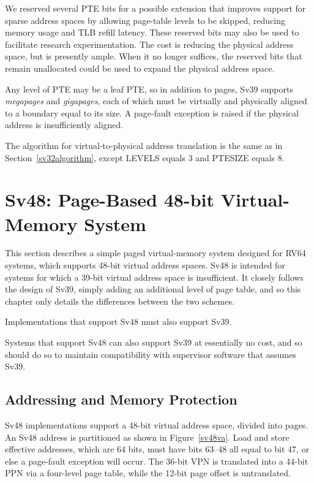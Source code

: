 \begin{commentary}
We reserved several PTE bits for a possible extension that improves
support for sparse address spaces by allowing page-table levels to be
skipped, reducing memory usage and TLB refill latency.  These reserved
bits may also be used to facilitate research experimentation.  The
cost is reducing the physical address space, but  is
presently ample.  When it no longer suffices, the reserved
bits that remain unallocated could be used to expand the physical
address space.
\end{commentary}

Any level of PTE may be a leaf PTE, so in addition to 
pages, Sv39 supports  {\em megapages} and
 {\em gigapages}, each of which must be virtually and
physically aligned to a boundary equal to its size.
A page-fault exception is raised if the physical address is insufficiently
aligned.

The algorithm for virtual-to-physical address translation is the same as in
Section~\ref{sv32algorithm}, except LEVELS equals 3 and PTESIZE equals 8.

\section{Sv48: Page-Based 48-bit Virtual-Memory System}
\label{sec:sv48}

This section describes a simple paged virtual-memory system designed
for RV64 systems, which supports 48-bit virtual address spaces.  Sv48
is intended for systems for which a 39-bit virtual address space is
insufficient.  It closely follows the design of Sv39, simply adding an
additional level of page table, and so this chapter only details the
differences between the two schemes.

Implementations that support Sv48 must also support Sv39.

\begin{commentary}
Systems that support Sv48 can also support Sv39 at essentially no cost, and so
should do so to maintain compatibility with supervisor software that assumes
Sv39.
\end{commentary}

\subsection{Addressing and Memory Protection}

Sv48 implementations support a 48-bit virtual address space, divided
into  pages.  An Sv48 address is partitioned as
shown in Figure~\ref{sv48va}.  Load and store effective addresses,
which are 64 bits, must have bits 63--48 all equal to bit 47, or else
a page-fault exception will occur.  The 36-bit VPN is translated into a
44-bit PPN via a four-level page table, while the 12-bit page offset
is untranslated.

